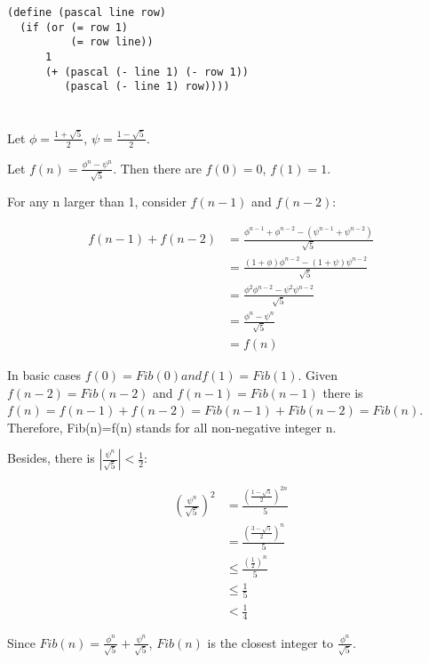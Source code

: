 \documentclass[a4paper]{report}
\begin{document}
\begin{lstlisting}
(define (pascal line row)
  (if (or (= row 1)
          (= row line))
      1
      (+ (pascal (- line 1) (- row 1))
         (pascal (- line 1) row))))
\end{lstlisting}


\section{}

Let $\phi = \frac{1 + \sqrt{5}}{2}$, $\psi = \frac{1 - \sqrt{5}}{2}$.

Let $f(n) = \frac{\phi ^ n - \psi ^ n}{\sqrt{5}}$. Then there are $f(0) = 0$, $f(1) = 1$.

For any n larger than 1, consider $f(n - 1)$ and $f(n - 2)$:

\begin{align*}
f(n-1) + f(n-2) &= \frac{\phi^{n-1} + \phi^{n-2}-(\psi^{n-1}+\psi^{n-2})}{\sqrt{5}} \\
                &= \frac{(1+\phi)\phi^{n-2}-(1+\psi)\psi^{n-2}}{\sqrt{5}} \\
                &= \frac{\phi^2\phi^{n-2}-\psi^2\psi^{n-2}}{\sqrt{5}} \\
                &= \frac{\phi^n-\psi^n}{\sqrt{5}} \\
                &= f(n)
\end{align*}

In basic cases $f(0)=Fib(0) and f(1)=Fib(1)$. Given $f(n-2)=Fib(n-2)$ and
 $f(n-1)=Fib(n-1)$ there is
 $f(n)=f(n-1)+f(n-2)=Fib(n-1)+Fib(n-2)=Fib(n)$. Therefore, Fib(n)=f(n)
 stands for all non-negative integer n.

Besides, there is $|\frac{\psi^n}{\sqrt{5}}|<\frac{1}{2}$:

\begin{align*}
({\frac{\psi^n}{\sqrt{5}}})^2 &=    \frac{({\frac{1-\sqrt{5}}{2}})^{2n}}{5} \\
                              &=    \frac{({\frac{3-\sqrt{5}}{2}})^{n}}{5} \\
                              &\leq \frac{(\frac{1}{2})^n}{5} \\
                              &\leq \frac{1}{5} \\
                              &<    \frac{1}{4}
\end{align*}

Since $Fib(n)=\frac{\phi^n}{\sqrt{5}}+\frac{\psi^n}{\sqrt{5}}$, $Fib(n)$ is the closest
 integer to $\frac{\phi^n}{\sqrt{5}}$.
\end{document}
